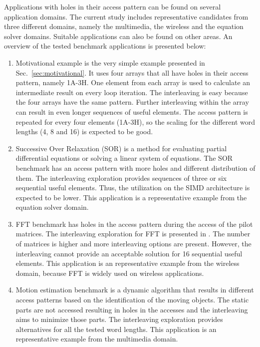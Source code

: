 \documentclass[prodmode,acmtecs]{acmsmall}
\begin{document}
Applications with holes in their access pattern can be found on several application domains.
The current study includes representative candidates from three different domains, namely the multimedia, the wireless and the equation solver domains.
Suitable applications can also be found on other areas.
An overview of the tested benchmark applications is presented below:

\begin{enumerate}
\item Motivational example is the very simple example presented in Sec.~\ref{sec:motivational}. 
It uses four arrays that all have holes in their access pattern, namely 1A-3H.
One element from each array is used to calculate an intermediate result on every loop iteration.
The interleaving is easy because the four arrays have the same pattern.
Further interleaving within the array can result in even longer sequences of useful elements.
The access pattern is repeated for every four elements (1A-3H), so the scaling for the different word lengths (4, 8 and 16) is expected to be good. 
\item Successive Over Relaxation (SOR) is a method for evaluating partial differential equations or solving a linear system of equations.
The SOR benchmark has an access pattern with more holes and different distribution of them.
The interleaving exploration provides sequences of three or six sequential useful elements.
Thus, the utilization on the SIMD architecture is expected to be lower.
This application is a representative example from the equation solver domain.
\item FFT benchmark has holes in the access pattern during the access of the pilot matrices. 
The interleaving exploration for FFT is presented in \cite{sharma2013data}.
The number of matrices is higher and more interleaving options are present.
However, the interleaving cannot provide an acceptable solution for 16 sequential useful elements.
This application is an representative example from the wireless domain, because FFT is widely used on wireless applications.
\item Motion estimation benchmark is a dynamic algorithm that results in different access patterns based on the identification of the moving objects. 
The static parts are not accessed resulting in holes in the accesses and the interleaving aims to minimize those parts.
The interleaving exploration provides alternatives for all the  tested word lengths. 
This application is an representative example from the multimedia domain.
\end{enumerate}
\end{document}
